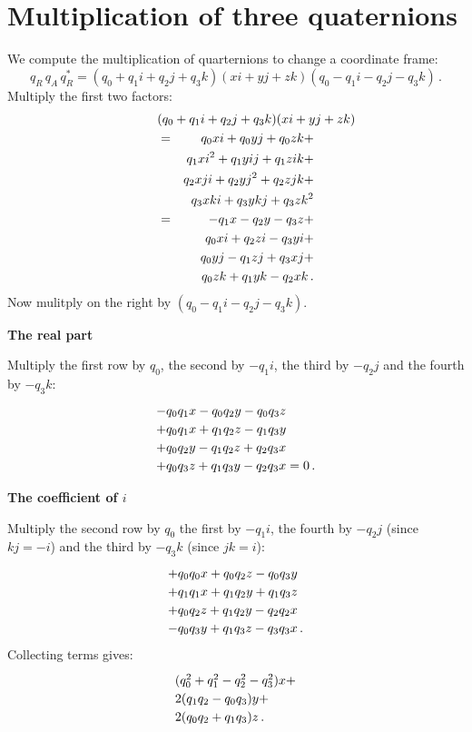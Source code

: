 \documentclass[11pt,a4paper]{report}
\newcommand*{\spacearray}{
\renewcommand{\arraystretch}{1.2}
\setlength{\arraycolsep}{4pt}
}
\begin{document}
\appendix
\chapter{Multiplication of three quaternions}\label{a.mult-quat}

We compute the multiplication of quarternions to change a coordinate frame:
\begin{displaymath}
q_R \, q_A \,  q^*_R = (q_0+q_1i+q_2j+q_3k)(xi+yj+zk)(q_0-q_1i-q_2j-q_3k)\,.
\end{displaymath}
Multiply the first two factors:
\begin{eqnarray*}
\lefteqn{(q_0+q_1i+q_2j+q_3k)(xi+yj+zk)}\\
&=& q_0xi+q_0yj+q_0zk+\\
&& q_1xi^2+q_1yij+q_1zik+\\
&& q_2xji+q_2yj^2+q_2zjk+\\
&& q_3xki+q_3ykj+q_3zk^2\\
&=& -q_1x-q_2y-q_3z+\\
&& q_0xi+q_2zi-q_3yi+\\
&& q_0yj-q_1zj+q_3xj+\\
&& q_0zk+q_1yk-q_2xk\,.
\end{eqnarray*}
Now mulitply on the right by $(q_0-q_1i-q_2j-q_3k)$.

\textbf{The real part}

Multiply the first row by $q_0$, the second by $-q_1i$, the third by $-q_2j$ and the fourth by $-q_3k$:
\begin{displaymath}
\spacearray
\begin{array}{l}
-q_0q_1x-q_0q_2y-q_0q_3z\\
+q_0q_1x+q_1q_2z-q_1q_3y\\
+q_0q_2y-q_1q_2z+q_2q_3x\\
+q_0q_3z+q_1q_3y-q_2q_3x=0\,.
\end{array}
\end{displaymath}

\textbf{The coefficient of $i$}

Multiply the second row by $q_0$ the first by $-q_1i$, the fourth by $-q_2j$ (since $kj=-i$) and the third by $-q_3k$ (since $jk=i$):
\begin{displaymath}
\spacearray
\begin{array}{l}
+q_0q_0x+q_0q_2z-q_0q_3y\\
+q_1q_1x+q_1q_2y+q_1q_3z\\
+q_0q_2z+q_1q_2y-q_2q_2x\\
-q_0q_3y+q_1q_3z-q_3q_3x\,.
\end{array}
\end{displaymath}
Collecting terms gives:
\begin{displaymath}
\spacearray
\begin{array}{l}
(q_0^2+q_1^2-q_2^2-q_3^2)x+\\
2(q_1q_2-q_0q_3)y+\\
2(q_0q_2+q_1q_3)z\,.
\end{array}
\end{displaymath}
\end{document}
